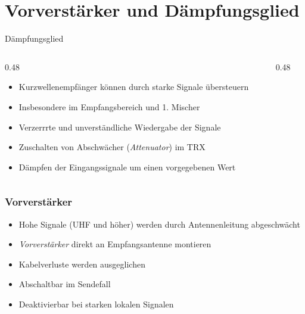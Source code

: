 
\section{Vorverstärker und Dämpfungsglied}
\label{section:vorverstaerker_daempfungsglied}
\begin{frame}{Dämpfungsglied}
\begin{columns}
    \begin{column}{0.48\textwidth}
        \begin{itemize}
            \item Kurzwellenempfänger können durch starke Signale übersteuern
            \item Insbesondere im Empfangsbereich und 1. Mischer
            \item Verzerrrte und unverständliche Wiedergabe der Signale
            \item Zuschalten von Abschwächer (\emph{Attenuator}) im TRX
            \item Dämpfen der Eingangssignale um einen vorgegebenen Wert
        \end{itemize}
    \end{column}
    \begin{column}{0.48\textwidth}
    \end{column}
\end{columns}

\end{frame}

\begin{frame}
\end{frame}

\begin{frame}
    \frametitle{Vorverstärker}
    \begin{itemize}
        \item Hohe Signale (UHF und höher) werden durch Antennenleitung abgeschwächt
        \item \emph{Vorverstärker} direkt an Empfangsantenne montieren
        \item Kabelverluste werden ausgeglichen
        \item Abschaltbar im Sendefall
        \item Deaktivierbar bei starken lokalen Signalen
    \end{itemize}
\end{frame}


